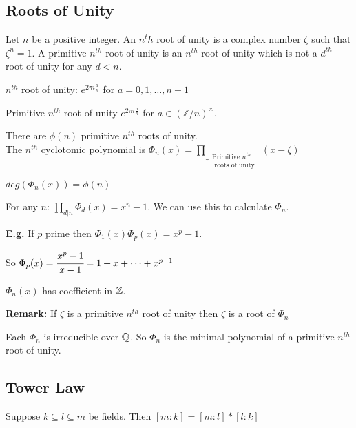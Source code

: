 \documentclass[11pt]{article}
\begin{document}
\subsection{Roots of Unity}
Let $n$ be a positive integer. 
An $n^th$ root of unity is a complex number $\zeta$ such that $\zeta^n = 1$.
A primitive $n^{th}$ root of unity is an $n^{th}$ root of unity which is not a $d^{th}$ root of unity for any $d<n$.


$n^{th}$ root of unity: $e^{2\pi i \frac{a}{n}}$ for $a = 0,1,\dots,n-1$

Primitive $n^{th}$ root of unity $e^{2\pi i \frac{a}{n}}$ for $a \in (\mathbb{Z}/n)^\times$.

There are $\phi(n)$ primitive $n^{th}$ roots of unity.
$ $\\[1em]
The $n^{th} $ cyclotomic polynomial is $\Phi_n(x) = \underbrace{\prod}_{\substack{\text{Primitive $n^{th}$} \\ \text{ roots of unity }}} (x - \zeta)$

$deg(\Phi_n(x)) = \phi(n)$





\begin{lemma}
	For any $n$: $\prod_{d|n} \Phi_d(x) = x^n - 1$.
	We can use this to calculate $\Phi_n$.
\end{lemma}
$ $\\
\textbf{E.g.} If $p$ prime then $\Phi_1(x)\Phi_p(x) = x^p -1 $.

So $\Phi_p(x) = \cfrac{x^p-1}{x-1} = 1+x+\dots + x^{p-1}$



\begin{cor}
	$\Phi_n(x)$ has coefficient in $\mathbb{Z}$.
\end{cor}
$ $\\[-0.5em]
\textbf{Remark:} If $\zeta$ is a primitive $n^{th}$ root of unity then $\zeta$ is a root of $\Phi_n$
\begin{theorem}
Each $\Phi_n$ is irreducible over $\mathbb{Q}$.
	So $\Phi_n$ is the minimal polynomial of a primitive $n^{th}$ root of unity.
\end{theorem}


\subsection{Tower Law}

\begin{theorem}
	Suppose $k \subseteq l \subseteq m $ be fields. Then $[m:k] = [m:l]*[l:k]$
\end{theorem}
\end{document}
